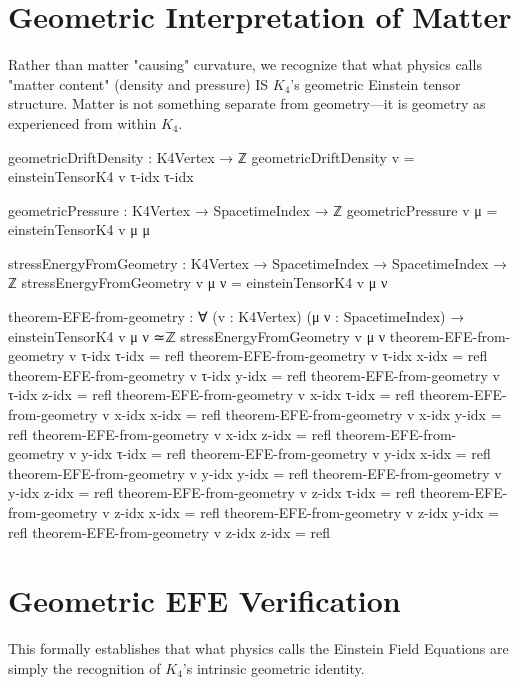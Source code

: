 \documentclass[11pt,a4paper]{book}
\begin{document}
\section{Geometric Interpretation of Matter}

Rather than matter "causing" curvature, we recognize that what physics calls "matter content" (density and pressure) IS $K_4$'s geometric Einstein tensor structure. Matter is not something separate from geometry—it is geometry as experienced from within $K_4$.

\begin{code}
geometricDriftDensity : K4Vertex → ℤ
geometricDriftDensity v = einsteinTensorK4 v τ-idx τ-idx

geometricPressure : K4Vertex → SpacetimeIndex → ℤ
geometricPressure v μ = einsteinTensorK4 v μ μ

stressEnergyFromGeometry : K4Vertex → SpacetimeIndex → SpacetimeIndex → ℤ
stressEnergyFromGeometry v μ ν = 
  einsteinTensorK4 v μ ν

theorem-EFE-from-geometry : ∀ (v : K4Vertex) (μ ν : SpacetimeIndex) →
  einsteinTensorK4 v μ ν ≃ℤ stressEnergyFromGeometry v μ ν
theorem-EFE-from-geometry v τ-idx τ-idx = refl
theorem-EFE-from-geometry v τ-idx x-idx = refl
theorem-EFE-from-geometry v τ-idx y-idx = refl
theorem-EFE-from-geometry v τ-idx z-idx = refl
theorem-EFE-from-geometry v x-idx τ-idx = refl
theorem-EFE-from-geometry v x-idx x-idx = refl
theorem-EFE-from-geometry v x-idx y-idx = refl
theorem-EFE-from-geometry v x-idx z-idx = refl
theorem-EFE-from-geometry v y-idx τ-idx = refl
theorem-EFE-from-geometry v y-idx x-idx = refl
theorem-EFE-from-geometry v y-idx y-idx = refl
theorem-EFE-from-geometry v y-idx z-idx = refl
theorem-EFE-from-geometry v z-idx τ-idx = refl
theorem-EFE-from-geometry v z-idx x-idx = refl
theorem-EFE-from-geometry v z-idx y-idx = refl
theorem-EFE-from-geometry v z-idx z-idx = refl
\end{code}

\section{Geometric EFE Verification}

This formally establishes that what physics calls the Einstein Field Equations are simply the recognition of $K_4$'s intrinsic geometric identity.
\end{document}
